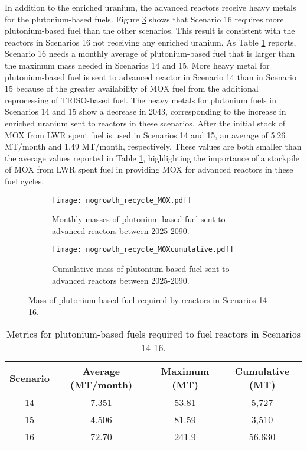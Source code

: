 In addition to the enriched uranium, the advanced 
reactors receive heavy metals for the plutonium-based 
fuels. Figure 
\ref{fig:nogrowth_recycle_mox} shows that Scenario 16 requires more 
plutonium-based fuel than the other scenarios. This result is consistent 
with the reactors in Scenarios 16 not receiving any enriched 
uranium. As Table 
\ref{tab:s14-16_mox} reports, Scenario 16 needs a monthly average 
of plutonium-based fuel that is larger than the maximum mass 
needed in Scenarios 14 and 15. More heavy metal for plutonium-based fuel
is sent to advanced reactor in Scenario 14 than  
in Scenario 15 because of the greater availability of 
\gls{MOX} fuel from the additional reprocessing of 
\gls{TRISO}-based fuel. The heavy metals for plutonium fuels 
in Scenarios 14 and 15 show a decrease in 2043, corresponding 
to the increase in enriched uranium sent to reactors in these 
scenarios. After the initial stock of \gls{MOX} from 
\gls{LWR} spent fuel is used in Scenarios 14 and 15, an 
average of 5.26 MT/month and 1.49 MT/month, respectively. These 
values are both smaller than the average values reported 
in Table \ref{tab:s14-16_mox}, highlighting the importance 
of a stockpile of \gls{MOX} from \gls{LWR} spent fuel in 
providing \gls{MOX} for advanced reactors in these fuel 
cycles. 

\begin{figure}[h!]
    \centering
    \begin{subfigure}[b]{0.45\textwidth}
        \centering
        \texttt{[image: nogrowth\_recycle\_MOX.pdf]}
        \caption{Monthly masses of plutonium-based fuel sent to 
        advanced reactors between 2025-2090.}
        \label{fig:nogrowth_recycle_AR_mox}
    \end{subfigure}
    \hfill
    \begin{subfigure}[b]{0.45\textwidth}
        \centering
        \texttt{[image: nogrowth\_recycle\_MOXcumulative.pdf]}
        \caption{Cumulative mass of plutonium-based fuel
        sent to advanced reactors between 2025-2090.}
        \label{fig:nogrowth_recycle_mox_cumulative}
    \end{subfigure}
       \caption{Mass of plutonium-based fuel required by reactors
        in Scenarios 14-16.}
       \label{fig:nogrowth_recycle_mox}
\end{figure}

\begin{table}[h!]
    \centering 
    \caption{Metrics for plutonium-based fuels required to fuel reactors 
    in Scenarios 14-16.}
    \label{tab:s14-16_mox}
    \begin{tabular}{c c c c}
        \hline 
        Scenario & Average (MT/month) & Maximum (MT) & Cumulative (MT) \\
        \hline 
        14 & 7.351 & 53.81 & 5,727 \\
        15 & 4.506 & 81.59 & 3,510 \\
        16 & 72.70 & 241.9 & 56,630 \\
        \hline
        
    \end{tabular}
\end{table}

